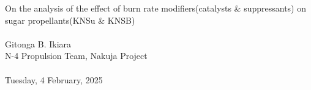 \documentclass[12pt,letterpaper]{article}
\begin{document}
	\begin{center}
		\huge{On the analysis of the effect of burn rate modifiers(catalysts \& suppressants) on sugar propellants(KNSu \& KNSB)} \\
		\\
		\Large{Gitonga B. Ikiara} \\
		\large{N-4 Propulsion Team, Nakuja Project} \\
		\\
		\normalsize{Tuesday, 4 February, 2025} \\
	\end{center}

	
	
	
	
	\appendix
	
	
\end{document}
